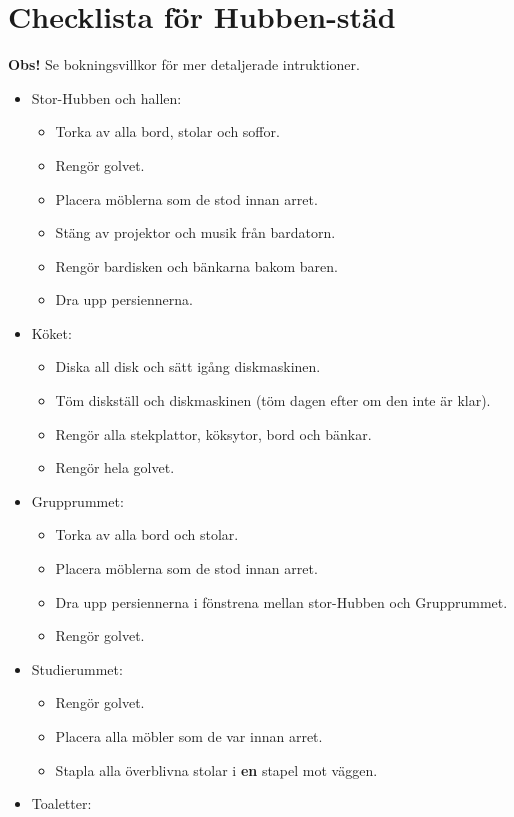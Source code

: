 \section{Checklista för Hubben-städ}
\textbf{Obs!} Se bokningsvillkor för mer detaljerade intruktioner.
 \begin{itemize}
   \item Stor-Hubben och hallen:
   \begin{itemize}
     \item Torka av alla bord, stolar och soffor.
     \item Rengör golvet.
     \item Placera möblerna som de stod innan arret.
     \item Stäng av projektor och musik från bardatorn.
     \item Rengör bardisken och bänkarna bakom baren.
     \item Dra upp persiennerna.
   \end{itemize}
   \item Köket:
   \begin{itemize}
     \item Diska all disk och sätt igång diskmaskinen.
     \item Töm diskställ och diskmaskinen (töm dagen efter om den inte är klar).
     \item Rengör alla stekplattor, köksytor, bord och bänkar.
     \item Rengör hela golvet.
   \end{itemize}
   \item Grupprummet:
   \begin{itemize}
     \item Torka av alla bord och stolar.
     \item Placera möblerna som de stod innan arret.
     \item Dra upp persiennerna i fönstrena mellan stor-Hubben och Grupprummet.
     \item Rengör golvet.
   \end{itemize}
   \item Studierummet:
   \begin{itemize}
     \item Rengör golvet.
     \item Placera alla möbler som de var innan arret.
     \item Stapla alla överblivna stolar i \textbf{en} stapel mot väggen.
   \end{itemize}
   \item Toaletter:

\end{itemize}
